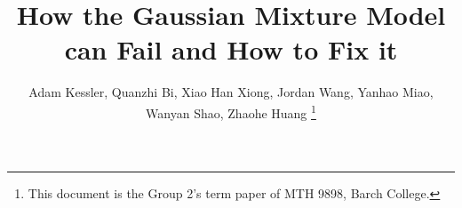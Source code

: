 \documentclass[10pt,journal,compsoc]{IEEEtran}
\begin{document}
%
\title{How the Gaussian Mixture Model can Fail and How to Fix it}
%
%
%
%

\author{Adam Kessler,
        Quanzhi Bi,
        Xiao Han Xiong,
        Jordan Wang,
        Yanhao Miao,
        Wanyan Shao,
        Zhaohe Huang%
\thanks{This document is the Group 2's term paper of MTH 9898, Barch College.}}
\end{document}
